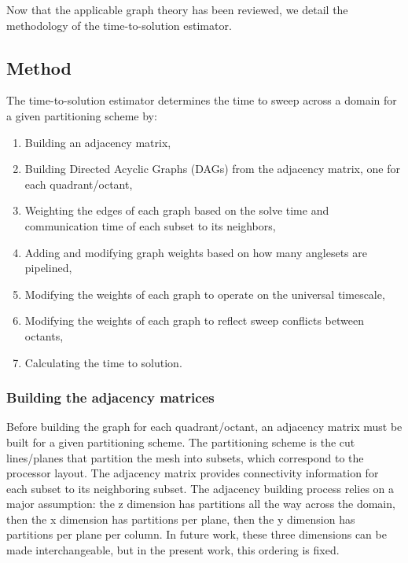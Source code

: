 \documentclass[times,final]{elsarticle}
\begin{document}

Now that the applicable graph theory has been reviewed, we detail the methodology of the time-to-solution estimator.

\subsection{Method}
The time-to-solution estimator determines the time to sweep across a domain for a given partitioning scheme by:
\begin{enumerate}
	\item Building an adjacency matrix,
	\item Building Directed Acyclic Graphs (DAGs) from the adjacency matrix, one for each quadrant/octant,
	\item Weighting the edges of each graph based on the solve time and communication time of each subset to its neighbors,
     \item Adding and modifying graph weights based on how many anglesets are pipelined,
	\item Modifying the weights of each graph to operate on the universal timescale,
	\item Modifying the weights of each graph to reflect sweep conflicts between octants,
	\item Calculating the time to solution.
\end{enumerate}

\subsubsection{Building the adjacency matrices}

Before building the graph for each quadrant/octant, an adjacency matrix must be built for a given partitioning scheme. The partitioning scheme is the cut lines/planes that partition the mesh into subsets, which correspond to the processor layout.
The adjacency matrix provides connectivity information for each subset to its neighboring subset.
The adjacency building process relies on a major assumption: the z dimension has partitions all the way across the domain, then the x dimension has partitions per plane, then the y dimension has partitions per plane per column.
In future work, these three dimensions can be made interchangeable, but in the present work, this ordering is fixed.
\end{document}
